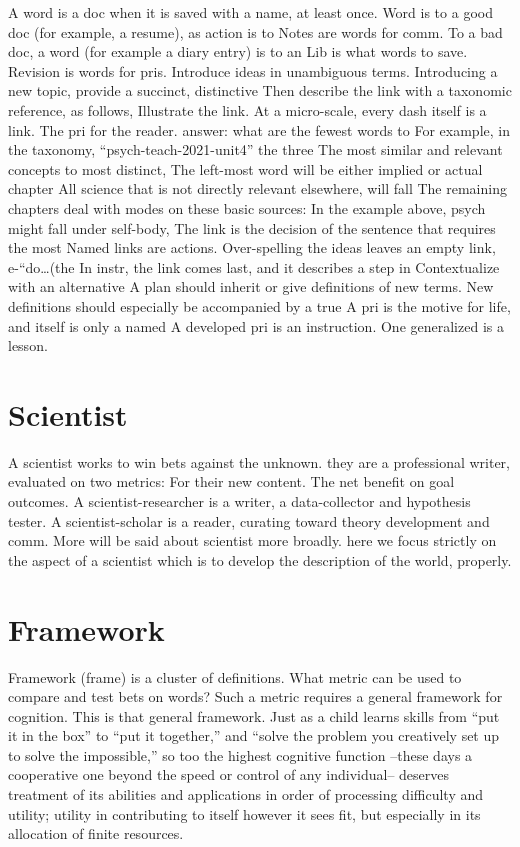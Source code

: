 \documentclass[
]{book}
\begin{document}
A word is a doc when it is saved with a name, at least once.
Word is to a good doc (for example, a resume), as action is to
Notes are words for comm.
To a bad doc, a word (for example a diary entry) is to an
Lib is what words to save.
Revision is words for pris.
Introduce ideas in unambiguous terms.
Introducing a new topic, provide a succinct, distinctive
Then describe the link with a taxonomic reference, as follows,
Illustrate the link.
At a micro-scale, every dash itself is a link.
The pri for the reader. answer: what are the fewest words to
For example, in the taxonomy, ``psych-teach-2021-unit4'' the three
The most similar and relevant concepts to most distinct,
The left-most word will be either implied or actual chapter
All science that is not directly relevant elsewhere, will fall
The remaining chapters deal with modes on these basic sources:
In the example above, psych might fall under self-body,
The link is the decision of the sentence that requires the most
Named links are actions.
Over-spelling the ideas leaves an empty link, e-``do\ldots(the
In instr, the link comes last, and it describes a step in
Contextualize with an alternative
A plan should inherit or give definitions of new terms.
New definitions should especially be accompanied by a true
A pri is the motive for life, and itself is only a named
A developed pri is an instruction.
One generalized is a lesson.

\hypertarget{scientist}{%
\section{Scientist}\label{scientist}}

A scientist works to win bets against the unknown. they are a professional writer, evaluated on two metrics:
For their new content.
The net benefit on goal outcomes.
A scientist-researcher is a writer, a data-collector and hypothesis tester.
A scientist-scholar is a reader, curating toward theory development and comm.
More will be said about scientist more broadly. here we focus strictly on the aspect of a scientist which is to develop the description of the world, properly.

\hypertarget{framework}{%
\section{Framework}\label{framework}}

Framework (frame) is a cluster of definitions.
What metric can be used to compare and test bets on words?
Such a metric requires a general framework for cognition.
This is that general framework.
Just as a child learns skills from ``put it in the box'' to ``put it together,'' and ``solve the problem you creatively set up to solve the impossible,'' so too the highest cognitive function --these days a cooperative one beyond the speed or control of any individual-- deserves treatment of its abilities and applications in order of processing difficulty and utility; utility in contributing to itself however it sees fit, but especially in its allocation of finite resources.
\end{document}
